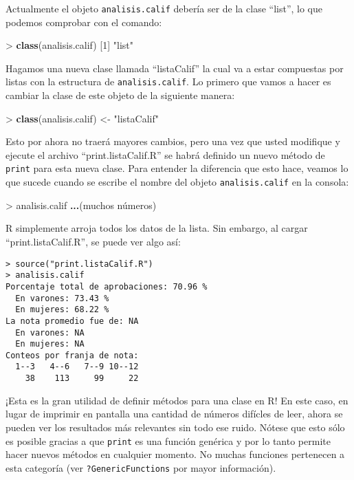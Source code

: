 \documentclass[]{article}
\newenvironment{Shaded}{}{}
\newcommand{\KeywordTok}[1]{\textcolor[rgb]{0.00,0.44,0.13}{\textbf{{#1}}}}
\newcommand{\DecValTok}[1]{\textcolor[rgb]{0.25,0.63,0.44}{{#1}}}
\newcommand{\StringTok}[1]{\textcolor[rgb]{0.25,0.44,0.63}{{#1}}}
\newcommand{\NormalTok}[1]{{#1}}
\begin{document}
Actualmente el objeto \texttt{analisis.calif} debería ser de la clase
``list'', lo que podemos comprobar con el comando:

\begin{Shaded}
\begin{Highlighting}[]
\NormalTok{> }\KeywordTok{class}\NormalTok{(analisis.calif)}
\NormalTok{[}\DecValTok{1}\NormalTok{] }\StringTok{"list"}
\end{Highlighting}
\end{Shaded}
Hagamos una nueva clase llamada ``listaCalif'' la cual va a estar
compuestas por listas con la estructura de \texttt{analisis.calif}. Lo
primero que vamos a hacer es cambiar la clase de este objeto de la
siguiente manera:

\begin{Shaded}
\begin{Highlighting}[]
\NormalTok{> }\KeywordTok{class}\NormalTok{(analisis.calif) <- }\StringTok{"listaCalif"}
\end{Highlighting}
\end{Shaded}
Esto por ahora no traerá mayores cambios, pero una vez que usted
modifique y ejecute el archivo ``print.listaCalif.R'' se habrá definido
un nuevo método de \texttt{print} para esta nueva clase. Para entender
la diferencia que esto hace, veamos lo que sucede cuando se escribe el
nombre del objeto \texttt{analisis.calif} en la consola:

\begin{Shaded}
\begin{Highlighting}[]
\NormalTok{> analisis.calif}
\KeywordTok{...}\NormalTok{(muchos números)}
\end{Highlighting}
\end{Shaded}
R simplemente arroja todos los datos de la lista. Sin embargo, al cargar
``print.listaCalif.R'', se puede ver algo así:

\begin{verbatim}
> source("print.listaCalif.R")
> analisis.calif
Porcentaje total de aprobaciones: 70.96 %
  En varones: 73.43 %
  En mujeres: 68.22 %
La nota promedio fue de: NA 
  En varones: NA 
  En mujeres: NA 
Conteos por franja de nota:
  1--3   4--6   7--9 10--12 
    38    113     99     22
\end{verbatim}
¡Esta es la gran utilidad de definir métodos para una clase en R! En
este caso, en lugar de imprimir en pantalla una cantidad de números
difícles de leer, ahora se pueden ver los resultados más relevantes sin
todo ese ruido. Nótese que esto sólo es posible gracias a que
\texttt{print} es una función genérica y por lo tanto permite hacer
nuevos métodos en cualquier momento. No muchas funciones pertenecen a
esta categoría (ver \texttt{?GenericFunctions} por mayor información).
\end{document}
